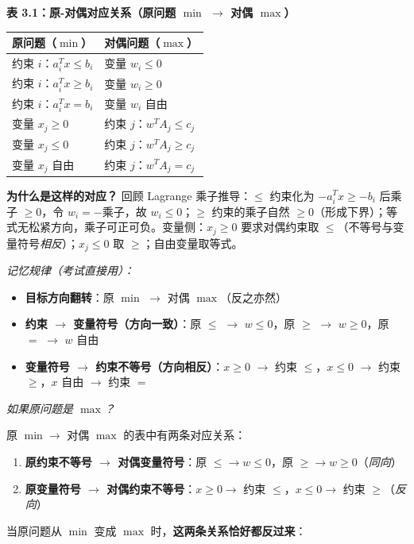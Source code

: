 \textbf{表 3.1：原-对偶对应关系（原问题 $\min$ $\to$ 对偶 $\max$）}

\medskip
\begin{tabular}{@{}ll@{}}
\toprule
\textbf{原问题（$\min$）} & \textbf{对偶问题（$\max$）} \\
\midrule
约束 $i$：$a_i^T x \le b_i$ & 变量 $w_i \le 0$ \\
约束 $i$：$a_i^T x \ge b_i$ & 变量 $w_i \ge 0$ \\
约束 $i$：$a_i^T x = b_i$  & 变量 $w_i$ 自由 \\[3pt]
变量 $x_j \ge 0$  & 约束 $j$：$w^T A_j \le c_j$ \\
变量 $x_j \le 0$  & 约束 $j$：$w^T A_j \ge c_j$ \\
变量 $x_j$ 自由   & 约束 $j$：$w^T A_j = c_j$ \\
\bottomrule
\end{tabular}

\medskip
\textbf{为什么是这样的对应？} 回顾 Lagrange 乘子推导：$\le$ 约束化为 $-a_i^T x \ge -b_i$ 后乘子 $\ge 0$，令 $w_i = -$乘子，故 $w_i \le 0$；$\ge$ 约束的乘子自然 $\ge 0$（形成下界）；等式无松紧方向，乘子可正可负。变量侧：$x_j \ge 0$ 要求对偶约束取 $\le$（不等号与变量符号\emph{相反}）；$x_j \le 0$ 取 $\ge$；自由变量取等式。

\medskip
\emph{记忆规律（考试直接用）：}
\begin{itemize}
  \item \textbf{目标方向翻转}：原 $\min$ $\to$ 对偶 $\max$（反之亦然）
  \item \textbf{约束 $\to$ 变量符号（方向一致）}：原 $\le$ $\to$ $w\le0$，原 $\ge$ $\to$ $w\ge0$，原 $=$ $\to$ $w$ 自由
  \item \textbf{变量符号 $\to$ 约束不等号（方向相反）}：$x\ge0$ $\to$ 约束 $\le$，$x\le0$ $\to$ 约束 $\ge$，$x$ 自由 $\to$ 约束 $=$
\end{itemize}

\medskip
\emph{如果原问题是 $\max$？}

原 $\min \to$ 对偶 $\max$ 的表中有两条对应关系：
\begin{enumerate}
  \item \textbf{原约束不等号 $\to$ 对偶变量符号}：原 $\le \to w\le0$，原 $\ge \to w\ge0$（\emph{同向}）
  \item \textbf{原变量符号 $\to$ 对偶约束不等号}：$x\ge0 \to$ 约束 $\le$，$x\le0 \to$ 约束 $\ge$（\emph{反向}）
\end{enumerate}

当原问题从 $\min$ 变成 $\max$ 时，\textbf{这两条关系恰好都反过来}：

